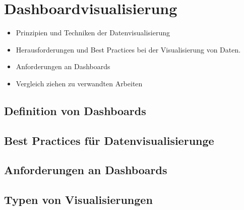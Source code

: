 \section{Dashboardvisualisierung}
\begin{itemize}
    \item Prinzipien und Techniken der Datenvisualisierung
    \item Herausforderungen und Best Practices bei der Visualisierung von Daten.
    \item Anforderungen an Dashboards
    \item Vergleich ziehen zu verwandten Arbeiten
\end{itemize}

\subsection{Definition von Dashboards}
\subsection{Best Practices für Datenvisualisierunge}
\subsection{Anforderungen an Dashboards}
\subsection{Typen von Visualisierungen}